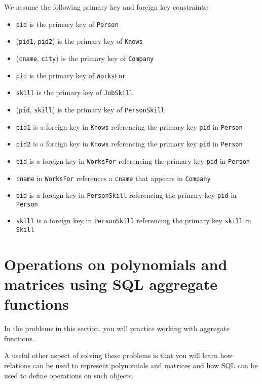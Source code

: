 \documentclass{article}
\begin{document}
We assume the following primary key and foreign key constraints:
\begin{itemize}
\item {\tt pid} is the primary key of {\tt Person}
\item ({\tt pid1}, {\tt pid2}) is the primary key of {\tt Knows}
\item ({\tt cname}, {\tt city}) is the primary key of {\tt Company}
\item {\tt pid} is the primary key of {\tt WorksFor}
\item {\tt skill} is the primary key of {\tt JobSkill}
\item ({\tt pid}, {\tt skill}) is the primary key of {\tt PersonSkill}
\item {\tt pid1} is a foreign key in {\tt Knows} referencing the primary key {\tt pid} in {\tt Person}
\item {\tt pid2} is a foreign key in {\tt Knows} referencing the primary key {\tt pid} in {\tt Person}
\item {\tt pid} is a foreign key in {\tt WorksFor} referencing the primary key {\tt pid} in {\tt Person}
\item {\tt cname} in {\tt WorksFor} references a {\tt cname} that appears in {\tt Company}
\item {\tt pid} is a foreign key in {\tt PersonSkill} referencing the primary key {\tt pid} in {\tt Person}
\item {\tt skill} is a foreign key in {\tt PersonSkill} referencing the primary key {\tt skill} in {\tt Skill}
\end{itemize}




\newpage
\section{Operations on polynomials and matrices using SQL aggregate functions}

In the problems in this section, you will practice working with aggregate functions.

A useful other aspect of solving these problems is that you will learn how relations can be used
to represent polynomials and matrices and how SQL can be used to define operations on
such objects.
\end{document}
